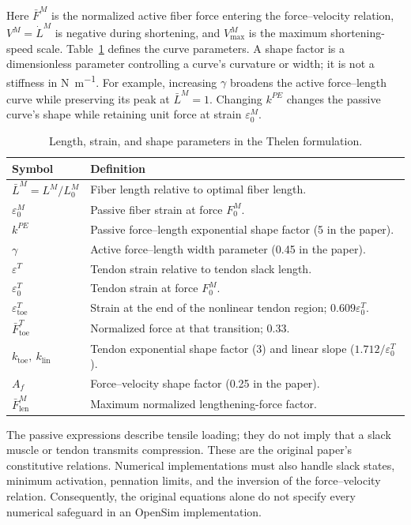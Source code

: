 Here $\bar F^M$ is the normalized active fiber force entering the force--velocity relation, $V^M=\dot L^M$ is negative during shortening, and $V^M_{\max}$ is the maximum shortening-speed scale. Table~\ref{tab:app_thelen_symbols} defines the curve parameters. A shape factor is a dimensionless parameter controlling a curve's curvature or width; it is not a stiffness in \unit{\newton\per\meter}. For example, increasing $\gamma$ broadens the active force--length curve while preserving its peak at $\bar L^M=1$. Changing $k^{PE}$ changes the passive curve's shape while retaining unit force at strain $\varepsilon_0^M$.

\begin{table}[htbp]
\centering\small
\caption{Length, strain, and shape parameters in the Thelen formulation.}
\label{tab:app_thelen_symbols}
\begin{tabularx}{\textwidth}{@{}lX@{}}
\toprule
Symbol & Definition \\
\midrule
$\bar L^M=L^M/L_0^M$ & Fiber length relative to optimal fiber length. \\
$\varepsilon_0^M$ & Passive fiber strain at force $F_0^M$. \\
$k^{PE}$ & Passive force--length exponential shape factor (5 in the paper). \\
$\gamma$ & Active force--length width parameter (0.45 in the paper). \\
$\varepsilon^T$ & Tendon strain relative to tendon slack length. \\
$\varepsilon_0^T$ & Tendon strain at force $F_0^M$. \\
$\varepsilon^T_{\mathrm{toe}}$ & Strain at the end of the nonlinear tendon region; $0.609\varepsilon_0^T$. \\
$\bar F^T_{\mathrm{toe}}$ & Normalized force at that transition; 0.33. \\
$k_{\mathrm{toe}},\ k_{\mathrm{lin}}$ & Tendon exponential shape factor (3) and linear slope ($1.712/\varepsilon_0^T$). \\
$A_f$ & Force--velocity shape factor (0.25 in the paper). \\
$\bar F^M_{\mathrm{len}}$ & Maximum normalized lengthening-force factor. \\
\bottomrule
\end{tabularx}
\end{table}

The passive expressions describe tensile loading; they do not imply that a slack muscle or tendon transmits compression. These are the original paper's constitutive relations. Numerical implementations must also handle slack states, minimum activation, pennation limits, and the inversion of the force--velocity relation. Consequently, the original equations alone do not specify every numerical safeguard in an OpenSim implementation.

